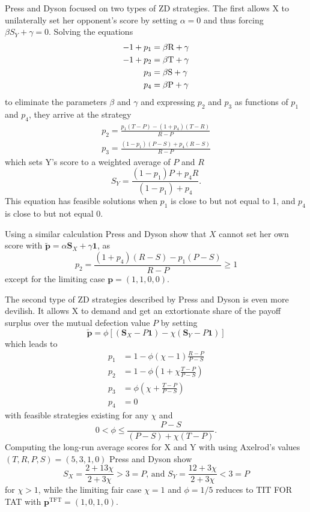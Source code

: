 Press and Dyson focused on two types of ZD strategies. The first allows X  to unilaterally set her opponent's score by setting $\alpha = 0$ and thus forcing $\beta S_Y + \gamma = 0$. Solving the equations
\begin{align*}
-1 + p_1 &= \beta \textrm{R} + \gamma \\
-1 + p_2 &= \beta \textrm{T} + \gamma \\
p_3 &= \beta \textrm{S} + \gamma \\
p_4 &= \beta \textrm{P} + \gamma
\end{align*}
to eliminate the parameters $\beta$ and $\gamma$ and expressing $p_2$ and $p_3$ as functions of $p_1$ and $p_4$, they arrive at the strategy
\begin{align*}
p_2 = \frac{p_1(T - P) - (1+p_4)(T-R)}{R-P} \\
p_3 = \frac{(1-p_1)(P-S)+p_4(R-S)}{R-P}
\end{align*}
which sets Y's score to a weighted average of $P$ and $R$
\[
S_Y = \frac{(1-p_1)P + p_4 R}{(1-p_1) + p_4}.
\]
This equation has feasible solutions when $p_1$ is close to but not equal to 1, and $p_4$ is close to but not equal 0.

Using a similar calculation Press and Dyson show that $X$ cannot set her own score with $\tilde{\mathbf{p}} = \alpha \mathbf{S}_X + \gamma \mathbf{1}$, as
\[
p_2 = \frac{(1+p_4)(R-S) - p_1(P-S)}{R-P} \geq 1
\]
except for the limiting case $\mathbf{p} = (1, 1, 0, 0)$.


The second type of ZD strategies described by Press and Dyson is even more devilish. It allows X to demand and get an extortionate share of the payoff surplus over the mutual defection value $P$ by setting
\[
\tilde{\mathbf{p}} = \phi [(\mathbf{S}_X - P\mathbf{1}) - \chi (\mathbf{S}_Y - P \mathbf{1})]
\]
which leads to
\begin{align*}
p_1 &= 1 - \phi(\chi-1) \frac{R-P}{P-S} \\
p_2 &= 1 - \phi\left(1 + \chi \frac{T-P}{P-S}\right) \\
p_3 &= \phi (\chi + \frac{T-P}{P-S}) \\
p_4 &= 0
\end{align*}
with feasible strategies existing for any $\chi$ and
\[
0 < \phi \leq \frac{P-S}{(P-S) + \chi(T-P)}.
\]
Computing the long-run average scores for X and Y with using Axelrod's values $(T, R, P, S) = (5, 3, 1, 0)$ Press and Dyson show
\[
S_X = \frac{2 + 13\chi}{2 + 3\chi} > 3 = P\textrm{, and } S_Y = \frac{12 + 3\chi}{2 + 3\chi} < 3 = P
\]
for $\chi > 1$, while the limiting fair case $\chi = 1$ and $\phi = 1/5$ reduces to TIT FOR TAT with $\mathbf{p}^\textrm{TFT} = (1, 0, 1, 0)$.

